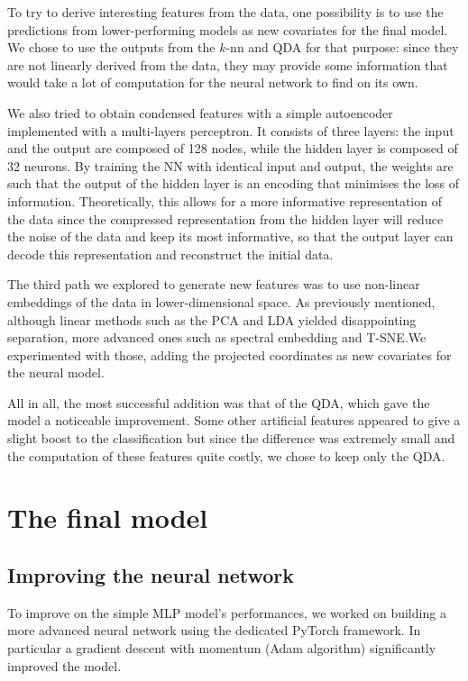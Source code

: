 \documentclass[a4paper,11pt,openany,extrafontsizes,oneside,article,twocolumn]{memoir}
\begin{document}
To try to derive interesting features from the data, one possibility
is to use the predictions from lower-performing models as new
covariates for the final model. We chose to use the outputs from the
$k$-nn and QDA for that purpose: since they are not linearly derived
from the data, they may provide some information that would take a lot
of computation for the neural network to find on its own.

We also tried to obtain condensed features with a simple autoencoder
implemented with a multi-layers perceptron. It consists of three
layers: the input and the output are composed of 128 nodes, while the
hidden layer is composed of 32 neurons. By training the NN with
identical input and output, the weights are such that the output of
the hidden layer is an encoding that minimises the loss of
information. Theoretically, this allows for a more informative
representation of the data since the compressed representation from
the hidden layer will reduce the noise of the data and keep its most
informative, so that the output layer can decode this representation
and reconstruct the initial data.

The third path we explored to generate new features was to use
non-linear embeddings of the data in lower-dimensional space. As
previously mentioned, although linear methods such as the PCA and LDA
yielded disappointing separation, more advanced ones such as spectral
embedding and T-SNE.\@ We experimented with those, adding the
projected coordinates as new covariates for the neural model.

All in all, the most successful addition was that of the QDA, which
gave the model a noticeable improvement. Some other artificial
features appeared to give a slight boost to the classification but
since the difference was extremely small and the computation of these
features quite costly, we chose to keep only the QDA.\@


\chapter{The final model}

\section{Improving the neural network}

To improve on the simple MLP model's performances, we worked on
building a more advanced neural network using the dedicated PyTorch
framework. In particular a gradient descent with momentum (Adam
algorithm) significantly improved the model.
\end{document}
